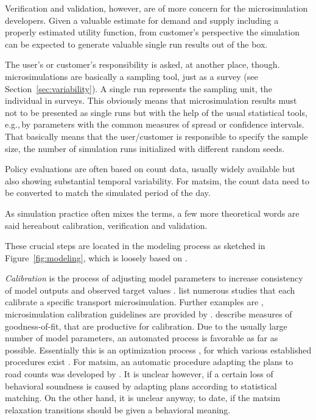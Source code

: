 Verification and validation, however, are of more concern for the \gls{microsimulation} developers. Given a valuable estimate for demand and supply including a properly estimated utility function, from customer's perspective the simulation can be expected to generate valuable single run results out of the box.

The user's or customer's responsibility is asked, at another place, though. \Glspl{microsimulation} are basically a sampling tool, just as a survey (see Section~\ref{sec:variability}). A single run represents the sampling unit, the individual in surveys. This obviously means that \gls{microsimulation} results must not to be presented as single runs but with the help of the usual statistical tools, e.g.,\,by parameters with the common measures of spread or confidence intervals. That basically means that the user/customer is responsible to specify the sample size, the number of simulation runs initialized with different random seeds. 

Policy evaluations are often based on count data, usually widely available but also showing substantial temporal variability. For \gls{matsim}, the count data need to be converted to match the simulated period of the day.

As simulation practice often mixes the terms, a few more theoretical words are said hereabout calibration, verification and validation. 

These crucial steps are located in the modeling process as sketched in Figure~\ref{fig:modeling}, which is loosely based on \citet[][Figure 10.2]{Petty_SokolowskiBanks_2010}. 

\emph{Calibration} is the process of adjusting model parameters to increase consistency of model outputs and observed target values \citep[][p.348]{HollanderLiu_Transportation_2007} \citep[see also][]{TrucanoEtAl_RESS_2006}. \citet[][Table 1]{HollanderLiu_Transportation_2007} list numerous studies that each calibrate a specific transport microsimulation. Further examples are \citet[][]{SmithEtAl_JTE_2008, KimEtAl_TRR_2005, RutterEtAl_JASA_2009}, microsimulation calibration guidelines are provided by \citet[][]{MilamChao_TRBATPM_2001, WegmannEverett_TechRep_CTRUT_2008, DowlingEtAl_manual_2002}. \citet[][Table 2]{HollanderLiu_Transportation_2007} describe measures of goodness-of-fit, that are productive for calibration. Due to the usually large number of model parameters, an automated process is favorable as far as possible. Essentially this is an optimization process \citep[][p.353]{HollanderLiu_Transportation_2007}, for which various established procedures exist \citep[e.g.,][p.41ff]{ZhangMa_ResRep_PATH_2008}. For \gls{matsim}, an automatic procedure adapting the plans to road counts was developed by \citet[][]{floetteroed-2010e}. It is unclear however, if a certain loss of behavioral soundness is caused by adapting plans according to statistical matching. On the other hand, it is unclear anyway, to date, if the \gls{matsim} relaxation transitions should be given a behavioral meaning.

